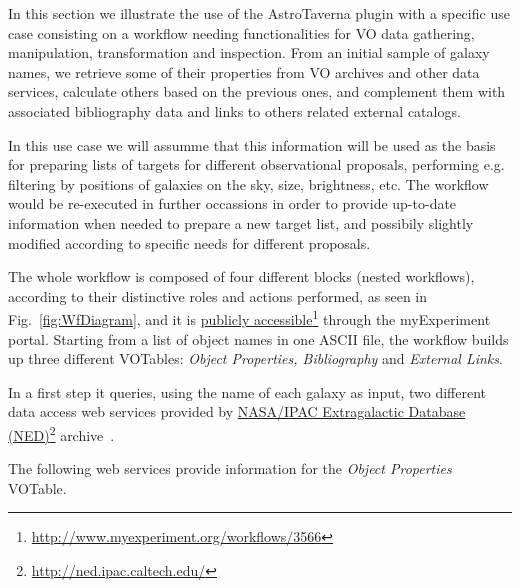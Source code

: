 \documentclass[final,authoryear,5p,times,twocolumn]{elsarticle}
\newcommand{\urlsamefont}[1]{\urlstyle{same}\url{#1}}
\newcommand{\hrefnote}[2]{\href{#1}{#2}\footnote{\urlsamefont{#1}}}
\begin{document}
In this section we illustrate the use of the AstroTaverna plugin with a specific use case consisting on a workflow needing functionalities for VO data gathering, manipulation, transformation and inspection. From an initial sample of galaxy names, we retrieve some of their properties from VO archives and other data services, calculate others based on the previous ones, and complement them with associated bibliography data and links to others related external catalogs.

In this use case we will assumme that this information will be used as the basis for preparing lists of targets for different observational proposals, performing e.g. filtering by positions of galaxies on the sky, size, brightness, etc. The workflow would be re-executed in further occassions in order to provide up-to-date information when needed to prepare a new target list, and possibily slightly modified according to specific needs for different proposals. 

The whole workflow is composed of four different blocks (nested workflows), according to their distinctive roles and actions performed, as seen in Fig.~\ref{fig:WfDiagram}, and it is \hrefnote{http://www.myexperiment.org/workflows/3566}{publicly accessible} through the myExperiment portal. Starting from a list of object names in one ASCII file, the workflow builds up three different VOTables: \textit{Object Properties, Bibliography} and \textit{External Links}.

In a first step it queries, using the name of each galaxy as input, two different data access web services provided by \hrefnote{http://ned.ipac.caltech.edu/}{NASA/IPAC Extragalactic Database (NED)} archive~\citep{Mazzarella2008}.

The following web services provide information for the \textit{Object Properties} VOTable.
\end{document}
